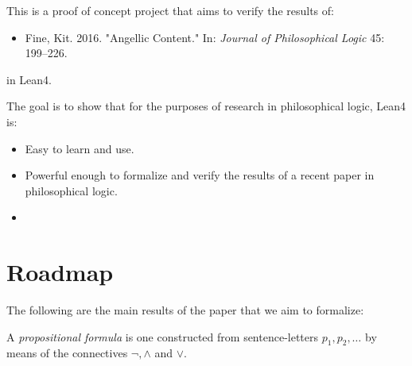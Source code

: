 %

This is a proof of concept project that aims to verify the results of:

\begin{itemize}
	\item Fine, Kit. 2016. "Angellic Content." In: \emph{Journal of Philosophical
		      Logic} 45: 199--226.
\end{itemize}

in Lean4.

The goal is to show that for the purposes of research in philosophical logic,
Lean4 is:

\begin{itemize}

	\item Easy to learn and use.
	\item Powerful enough to formalize and verify the results of a recent paper in
	      philosophical logic.
	\item

\end{itemize}

\section{Roadmap}

The following are the main results of the paper that we aim to formalize:

\begin{definition}
	\leanok
	A \emph{propositional formula} is one constructed from sentence-letters $p_1,
		p_2, \dots$ by means of the connectives $\neg,\land$ and $\lor$.
\end{definition}

